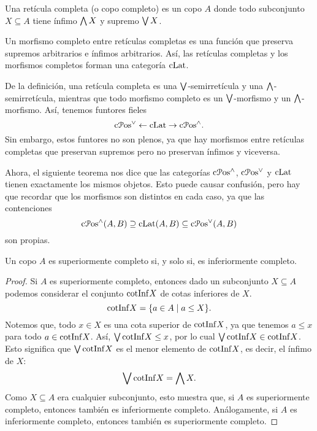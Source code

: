 \begin{definition}
  Una retícula completa (o copo completo) es un copo $A$
  donde todo subconjunto $X\subseteq A$ tiene ínfimo $\bigwedge X$ y
  supremo $\bigvee X$.

  Un morfismo completo entre retículas completas es una función que
  preserva supremos arbitrarios e ínfimos arbitrarios.
  Así, las retículas completas y los morfismos completos forman una
  categoría $\mathrm{cLat}$.
\end{definition}
De la definición, una retícula completa es una
$\bigvee$-semirretícula y una $\bigwedge$-semirretícula, mientras que todo
morfismo completo es un $\bigvee$-morfismo y un $\bigwedge$-morfismo.
Así, tenemos funtores fieles
\begin{equation}
  \mathrm{c}\mathcal{P}\mathrm{os}^\vee \leftarrow \mathrm{cLat} \to \mathrm{c}\mathcal{P}\mathrm{os}^\wedge.
\end{equation}
Sin embargo, estos funtores no son plenos, ya que hay morfismos entre
retículas completas que preservan supremos pero no preservan ínfimos y
viceversa.

Ahora, el siguiente teorema nos dice que las categorías $\mathrm{c}\mathcal{P}\mathrm{os}^\wedge$,
$\mathrm{c}\mathcal{P}\mathrm{os}^\vee$ y $\mathrm{cLat}$ tienen exactamente los mismos objetos.
Esto puede causar confusión, pero hay que recordar que los morfismos
son distintos en cada caso, ya que las contenciones
\[
  \mathrm{c}\mathcal{P}\mathrm{os}^\wedge(A,B)\supseteq \mathrm{cLat}(A,B)\subseteq\mathrm{c}\mathcal{P}\mathrm{os}^\vee(A,B)
\]
son propias.
\begin{proposition}
  Un copo $A$ es superiormente completo si, y solo si, es
  inferiormente completo.
\end{proposition}
\begin{proof}
  Si $A$ es superiormente completo, entonces
  dado un subconjunto $X\subseteq A$ podemos considerar el conjunto
  $\mathrm{cotInf} X$ de cotas inferiores de $X$.
  \[
    \mathrm{cotInf} X = \{a\in A \mid a\leq X\}
  .\]
  Notemos que, todo $x\in X$ es una cota superior de $\mathrm{cotInf} X$,
  ya que tenemos $a\leq x$ para todo $a\in\mathrm{cotInf} X$.
  Así, $\bigvee\mathrm{cotInf} X\leq x$, por lo cual
  $\bigvee\mathrm{cotInf} X\in\mathrm{cotInf} X$.
  Esto significa que $\bigvee\mathrm{cotInf} X$ es el menor elemento de $\mathrm{cotInf}
  X$, es decir, el ínfimo de $X$:
  \[
    \bigvee\mathrm{cotInf} X = \bigwedge X
  .\]
  Como $X\subseteq A$ era cualquier subconjunto,
  esto muestra que, si $A$ es superiormente completo, entonces
  también es inferiormente completo.
  Análogamente, si $A$ es inferiormente completo, entonces también
  es superiormente completo.
\end{proof}


